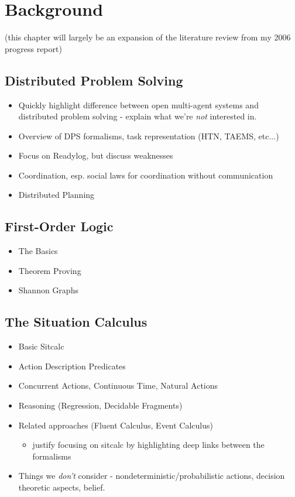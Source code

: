 \chapter{Background}\label{ch:lit-review}

(this chapter will largely be an expansion of the literature review from my 2006 progress report)

\section{Distributed Problem Solving}

\begin{itemize}
\item Quickly highlight difference between open multi-agent systems and
distributed problem solving - explain what we're \emph{not} interested in.
\item Overview of DPS formalisms, task representation (HTN, TAEMS, etc...)
\item Focus on Readylog, but discuss weaknesses
\item Coordination, esp. social laws for coordination without communication
\item Distributed Planning
\end{itemize}

\section{First-Order Logic}

\begin{itemize}
\item The Basics
\item Theorem Proving
\item Shannon Graphs
\end{itemize}

\section{The Situation Calculus}

\begin{itemize}
\item Basic Sitcalc
\item Action Description Predicates
\item Concurrent Actions, Continuous Time, Natural Actions
\item Reasoning (Regression, Decidable Fragments)
\item Related approaches (Fluent Calculus, Event Calculus)
  \begin{itemize}
  \item justify focusing on sitcalc by highlighting deep links between the formalisms
  \end{itemize}
\item Things we \emph{don't} consider - nondeterministic/probabilistic actions, decision theoretic aspects, belief.
\end{itemize}

